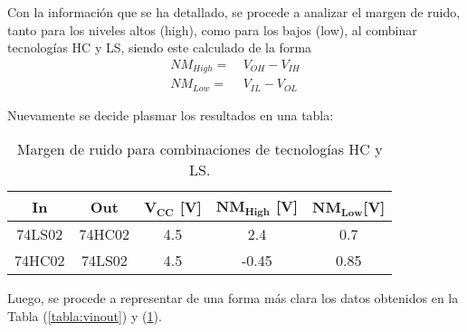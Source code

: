 Con la información que se ha detallado, se procede a analizar el margen de ruido, tanto para los niveles altos (high), como para los bajos (low), al combinar tecnologías HC y LS, siendo este calculado de la forma
\begin{equation*}
\begin{aligned}
		NM_{High}=\ & V_{OH} - V_{IH} \\
		NM_{Low}=\ & V_{IL} - V_{OL} 
\end{aligned}
\end{equation*}

Nuevamente se decide plasmar los resultados en una tabla:
\begin{table}[H]
\centering
\begin{tabular}{|c|c|c|c|c|}
\hline
\textbf{In} & \textbf{Out} & $\mathbf{V_{CC}}$ \textbf{[V]} & $\mathbf{NM_{High}}$ \textbf{[V]} & $\mathbf{NM_{Low}} $\textbf{[V]} \\ \hline
74LS02      & 74HC02       & 4.5                            & 2.4                               & 0.7                              \\ 
74HC02      & 74LS02       & 4.5                              & -0.45                               & 0.85                                \\ \hline
\end{tabular}
\caption{Margen de ruido para combinaciones de tecnologías HC y LS.}
\label{tabla:nm}
\end{table}

Luego, se procede a representar de una forma más clara los datos obtenidos en la Tabla (\ref{tabla:vinout}) y (\ref{tabla:nm}).  

